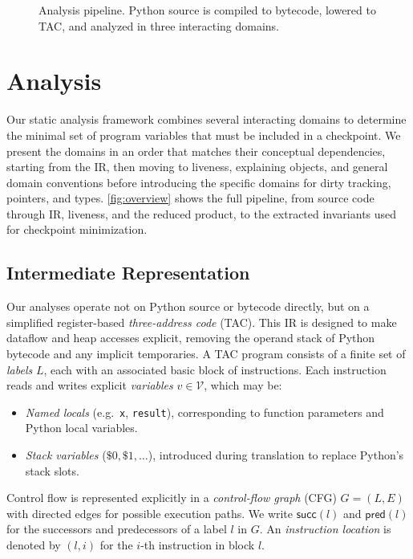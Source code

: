 \begin{figure}[t]
    \centering
    
    \caption{Analysis pipeline. Python source is compiled to bytecode, lowered to TAC, and analyzed in three interacting domains.}
    \label{fig:overview}
\end{figure}

\section{Analysis}
\label{sec:analysis}

Our static analysis framework combines several interacting domains to determine the minimal set of program variables that must be included in a checkpoint.  
We present the domains in an order that matches their conceptual dependencies, starting from the IR, then moving to liveness, explaining objects, and general domain conventions before introducing the specific domains for dirty tracking, pointers, and types. \autoref{fig:overview} shows the full pipeline, from source code through IR, liveness, and the reduced product, to the extracted invariants used for checkpoint minimization.

\subsection{Intermediate Representation}
Our analyses operate not on Python source or bytecode directly, but on a simplified register-based \emph{three-address code} (TAC).
This IR is designed to make dataflow and heap accesses explicit, removing the operand stack of Python bytecode and any implicit temporaries.
A TAC program consists of a finite set of \emph{labels} $L$, each with an associated basic block of instructions.
Each instruction reads and writes explicit \emph{variables} $v \in \mathcal{V}$, which may be:
\begin{itemize}
    \item \emph{Named locals} (e.g.\ \texttt{x}, \texttt{result}), corresponding to function parameters and Python local variables.
    \item \emph{Stack variables} ($\$0, \$1, \ldots$), introduced during translation to replace Python's stack slots.
\end{itemize}
Control flow is represented explicitly in a \emph{control-flow graph} (CFG) $G = (L, E)$ with directed edges for possible execution paths.
We write $\mathsf{succ}(l)$ and $\mathsf{pred}(l)$ for the successors and predecessors of a label $l$ in $G$.
An \emph{instruction location} is denoted by $(l, i)$ for the $i$-th instruction in block $l$.

